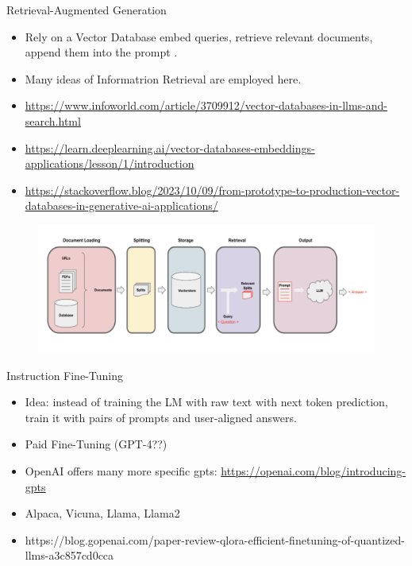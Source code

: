 \documentclass[handout]{beamer}
\begin{document}
\begin{frame}{Retrieval-Augmented Generation}
\begin{scriptsize}
\begin{itemize}
\item Rely on a Vector Database embed queries, retrieve relevant documents, append them into the prompt
\cite{lewis2021retrievalaugmented}.
\item Many ideas of Informatrion Retrieval are employed here.

\item \url{https://www.infoworld.com/article/3709912/vector-databases-in-llms-and-search.html}
\item \url{https://learn.deeplearning.ai/vector-databases-embeddings-applications/lesson/1/introduction}
\item \url{https://stackoverflow.blog/2023/10/09/from-prototype-to-production-vector-databases-in-generative-ai-applications/}
\end{itemize}
\end{scriptsize}

    \begin{figure}[h]
        	\includegraphics[scale = 0.2]{pics/vectordatabase.png}
        \end{figure}  


\end{frame}



\begin{frame}{Instruction Fine-Tuning}
\begin{scriptsize}
\begin{itemize}
\item Idea: instead of training the LM with raw text with next token prediction, train it with pairs of prompts and user-aligned answers.
\item Paid Fine-Tuning (GPT-4??)  
\item OpenAI offers many more specific gpts: \url{https://openai.com/blog/introducing-gpts}
\item Alpaca, Vicuna, Llama, Llama2
\item https://blog.gopenai.com/paper-review-qlora-efficient-finetuning-of-quantized-llms-a3c857cd0cca
\end{itemize}
\end{scriptsize}
\end{frame}
\end{document}
